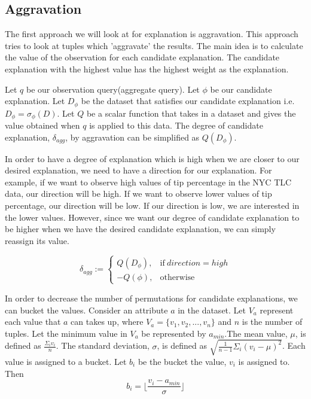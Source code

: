 \subsection{Aggravation}
\label{sec:aggravation}

The first approach we will look at for explanation is aggravation. This approach tries to look at tuples which 'aggravate' the results. The main idea is to calculate the value of the observation for each candidate explanation. The candidate explanation with the highest value has the highest weight as the explanation.

Let $q$ be our observation query(aggregate query). Let $\phi$ be our candidate explanation. Let $D_\phi$ be the dataset that satisfies our candidate explanation i.e. $D_\phi = \sigma_\phi(D)$. Let $Q$ be a scalar function that takes in a dataset and gives the value obtained when $q$ is applied to this data. The degree of candidate explanation, $\delta_{agg}$, by aggravation can be simplified as $Q(D_\phi)$.

In order to have a degree of explanation which is high when we are closer to our desired explanation, we need to have a direction for our explanation. For example, if we want to observe high values of tip percentage in the NYC TLC data, our direction will be high. If we want to observe lower values of tip percentage, our direction will be low. If our direction is low, we are interested in the lower values. However, since we want our degree of candidate explanation to be higher when we have the desired candidate explanation, we can simply reassign its value.

\begin{equation}
\delta_{agg}:=
    \begin{cases}
      Q(D_\phi), & \text{if}\ direction=high \\
      -Q(\phi), & \text{otherwise}
    \end{cases}
\end{equation}

In order to decrease the number of permutations for candidate explanations, we can bucket the values. Consider an attribute $a$ in the dataset. Let $V_a$ represent each value that $a$ can takes up, where $V_a=\{v_1,v_2,...,v_n\}$ and $n$ is the number of tuples. Let the minimum value in $V_a$ be represented by $a_{min}$.The mean value, $\mu$, is defined as $\frac{\Sigma_iv_i}{n}$. The standard deviation, $\sigma$, is defined as $\sqrt{\frac{1}{n-1}\Sigma_i(v_i-\mu)^2}$. Each value is assigned to a bucket. Let $b_i$ be the bucket the value, $v_i$ is assigned to. Then $$b_i = \bigg \lfloor\frac{v_i-a_{min}}{\sigma} \bigg \rfloor$$

